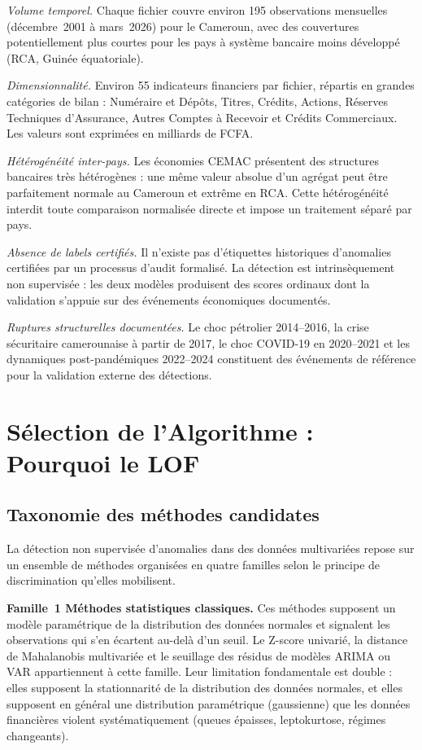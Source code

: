 \documentclass[12pt,a4paper]{article}
\begin{document}
\textit{Volume temporel.} Chaque fichier couvre environ 195 observations
mensuelles (décembre~2001 à mars~2026) pour le Cameroun, avec des couvertures
potentiellement plus courtes pour les pays à système bancaire moins développé
(RCA, Guinée équatoriale).

\textit{Dimensionnalité.} Environ 55 indicateurs financiers par fichier,
répartis en grandes catégories de bilan : Numéraire et Dépôts, Titres,
Crédits, Actions, Réserves Techniques d'Assurance, Autres Comptes à Recevoir
et Crédits Commerciaux. Les valeurs sont exprimées en milliards de FCFA.

\textit{Hétérogénéité inter-pays.} Les économies CEMAC présentent des
structures bancaires très hétérogènes : une même valeur absolue d'un agrégat
peut être parfaitement normale au Cameroun et extrême en RCA. Cette
hétérogénéité interdit toute comparaison normalisée directe et impose un
traitement séparé par pays.

\textit{Absence de labels certifiés.} Il n'existe pas d'étiquettes historiques
d'anomalies certifiées par un processus d'audit formalisé. La détection est
intrinsèquement non supervisée : les deux modèles produisent des scores
ordinaux dont la validation s'appuie sur des événements économiques documentés.

\textit{Ruptures structurelles documentées.} Le choc pétrolier 2014--2016,
la crise sécuritaire camerounaise à partir de 2017, le choc COVID-19 en
2020--2021 et les dynamiques post-pandémiques 2022--2024 constituent des
événements de référence pour la validation externe des détections.

\section{Sélection de l'Algorithme : Pourquoi le LOF}

\subsection{Taxonomie des méthodes candidates}

La détection non supervisée d'anomalies dans des données multivariées repose
sur un ensemble de méthodes organisées en quatre familles selon le principe
de discrimination qu'elles mobilisent.

\textbf{Famille~1  Méthodes statistiques classiques.} Ces méthodes
supposent un modèle paramétrique de la distribution des données normales et
signalent les observations qui s'en écartent au-delà d'un seuil. Le
Z-score univarié, la distance de Mahalanobis multivariée et le seuillage
des résidus de modèles ARIMA ou VAR appartiennent à cette famille. Leur
limitation fondamentale est double : elles supposent la stationnarité de la
distribution des données normales, et elles supposent en général une
distribution paramétrique (gaussienne) que les données financières violent
systématiquement (queues épaisses, leptokurtose, régimes changeants).
\end{document}
